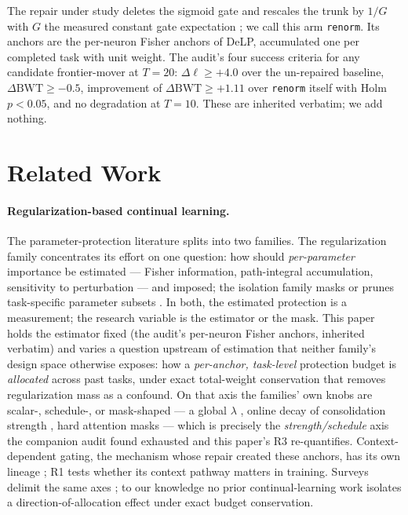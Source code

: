 \documentclass[10pt]{article}
\newcommand{\delp}{DeLP}
\newcommand{\gain}{\Delta\ell}
\newcommand{\dbwt}{\Delta\mathrm{BWT}}
\begin{document}
The repair under study deletes the sigmoid gate and rescales the trunk by
$1/G$ with $G$ the measured constant gate expectation
\citep{zhou2026delp,zhou2026anchorbudget}; we call this arm \texttt{renorm}. Its anchors are the
per-neuron Fisher anchors of \delp{}, accumulated one per completed task
with unit weight. The audit's four success criteria for any candidate
frontier-mover at $T{=}20$: $\gain\ge+4.0$ over the un-repaired baseline,
$\dbwt\ge-0.5$, improvement of $\dbwt\ge+1.11$ over \texttt{renorm} itself
with Holm $p<0.05$, and no degradation at $T{=}10$. These are inherited
verbatim; we add nothing.

\section{Related Work}
\label{sec:related}

\paragraph{Regularization-based continual learning.}
The parameter-protection literature splits into two families. The
regularization family
\citep{kirkpatrick2017,zenke2017,aljundi2018,chaudhry2018}
concentrates its effort on one question: how should \emph{per-parameter}
importance be estimated --- Fisher information, path-integral accumulation,
sensitivity to perturbation --- and imposed; the isolation family masks or
prunes task-specific parameter subsets \citep{serra2018,mallya2018}. In
both, the estimated protection is a
measurement; the research variable is the estimator or the mask. This paper
holds the
estimator fixed (the audit's per-neuron Fisher anchors, inherited verbatim)
and varies a question upstream of estimation that neither family's design
space
otherwise exposes: how a \emph{per-anchor, task-level} protection
budget is \emph{allocated} across past tasks, under exact total-weight
conservation that removes regularization mass as a confound. On that axis
the families' own knobs are scalar-, schedule-, or mask-shaped --- a global
$\lambda$
\citep{kirkpatrick2017}, online decay of consolidation strength
\citep{chaudhry2018}, hard attention masks \citep{serra2018} --- which is
precisely the \emph{strength/schedule} axis the companion audit found
exhausted and this paper's R3 re-quantifies. Context-dependent gating, the
mechanism whose repair created these anchors, has its own lineage
\citep{masse2018}; R1 tests whether its context pathway matters in training.
Surveys delimit the same axes \citep{delange2022,parisi2019}; to our
knowledge no prior continual-learning work isolates a direction-of-allocation
effect under exact budget conservation.
\end{document}
